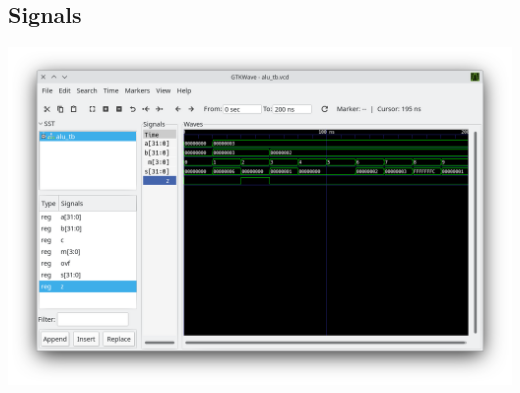 \documentclass[dvipsnames, svgnames, x11names, a4paper, 11pt]{article}
\begin{document}
\subsection{Signals}
\begin{center}
    \includegraphics[width=0.7\textheight, height=\textwidth, angle=90]{signals}
\end{center}
\end{document}
